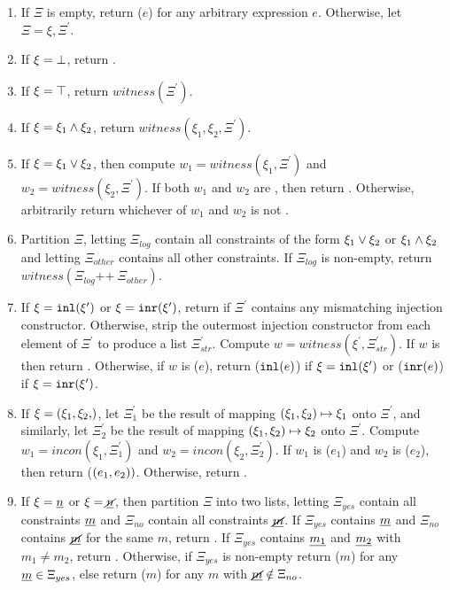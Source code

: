 \begin{enumerate}
\item If $\Xi$ is empty, return ($e$) for any arbitrary expression $e$. Otherwise, let $\Xi = \xi, \Xi^\prime$.
\item If $\xi = \bot$, return .
\item If $\xi = \top$, return $witness(\Xi^\prime)$.
\item If $\xi = \xi_1 \wedge \xi_2$, return $witness(\xi_1, \xi_2, \Xi^\prime)$.
\item If $\xi = \xi_1 \vee \xi_2$, then compute $w_1 = witness(\xi_1, \Xi^\prime)$ and $w_2 = witness(\xi_2, \Xi^\prime)$. If both $w_1$ and $w_2$ are , then return . Otherwise, arbitrarily return whichever of $w_1$ and $w_2$ is not .
\item Partition $\Xi$, letting $\Xi_{log}$ contain all constraints of the form $\xi_1 \vee \xi_2$ or $\xi_1 \wedge \xi_2$ and letting $\Xi_{other}$ contains all other constraints. If $\Xi_{log}$ is non-empty, return $witness(\Xi_{log} \texttt{++}~ \Xi_{other})$.
\item If $\xi = \mathtt{inl}(\xi^\prime)$ or $\xi = \mathtt{inr}(\xi^\prime)$, return  if $\Xi^\prime$ contains any mismatching injection constructor. Otherwise, strip the outermost injection constructor from each element of $\Xi^\prime$ to produce a list $\Xi^\prime_{str}$. Compute $w = witness(\xi^\prime, \Xi^\prime_{str})$. If $w$ is  then return . Otherwise, if $w$ is ($e$), return ($\mathtt{inl}(e)$) if $\xi = \mathtt{inl}(\xi^\prime)$ or ($\mathtt{inr}(e)$) if $\xi = \mathtt{inr}(\xi^\prime)$.

\item If $\xi = \cpair{\xi_1, \xi_2}$, let $\Xi^\prime_1$ be the result of mapping $(\xi_1 , \xi_2) \mapsto \xi_1$ onto $\Xi^\prime$, and similarly, let $\Xi^\prime_2$ be the result of mapping $(\xi_1 , \xi_2) \mapsto \xi_2$ onto $\Xi^\prime$. Compute $w_1 = incon(\xi_1, \Xi^\prime_1)$ and $w_2 =  incon(\xi_2, \Xi^\prime_2)$. If $w_1$ is ($e_1$) and $w_2$ is ($e_2$), then return ($(e_1 , e_2))$. Otherwise, return .

\item If $\xi = \underline{n}$ or $\xi = \underline{\cancel{n}}$, then partition $\Xi$ into two lists, letting $\Xi_{yes}$ contain all constraints $\underline{m}$ and $\Xi_{no}$ contain all constraints $\underline{\cancel{m}}$. If $\Xi_{yes}$ contains $\underline{m}$ and $\Xi_{no}$ contains $\underline{\cancel{m}}$ for the same $m$, return . If $\Xi_{yes}$ contains $\underline{m_1}$ and $\underline{m_2}$ with $m_1 \neq m_2$, return . Otherwise, if $\Xi_{yes}$ is non-empty return ($m$) for any $\underline{m} \in \Xi_{yes}$, else return ($m$) for any $m$ with $\underline{\cancel{m}} \notin \Xi_{no}$.
\end{enumerate}

